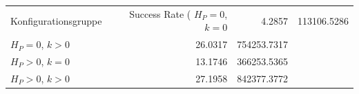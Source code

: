 \begin{tabular}{lrr}
\toprule
Konfigurationsgruppe & Success Rate (%
\midrule
$H_P=0$, $k=0$ & 4.2857 & 113106.5286 \\
$H_P=0$, $k>0$ & 26.0317 & 754253.7317 \\
$H_P>0$, $k=0$ & 13.1746 & 366253.5365 \\
$H_P>0$, $k>0$ & 27.1958 & 842377.3772 \\
\bottomrule
\end{tabular}
